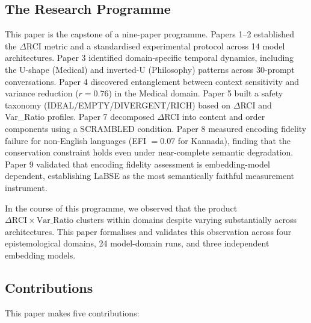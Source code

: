 \documentclass[11pt,a4paper]{article}
\begin{document}
\subsection{The Research Programme}

This paper is the capstone of a nine-paper programme. Papers 1--2
\citep{laxman2026a,laxman2026b} established the $\Delta$RCI metric and a standardised
experimental protocol across 14 model architectures. Paper 3 \citep{laxman2026c}
identified domain-specific temporal dynamics, including the U-shape (Medical) and
inverted-U (Philosophy) patterns across 30-prompt conversations. Paper 4
\citep{laxman2026d} discovered entanglement between context sensitivity and variance
reduction ($r = 0.76$) in the Medical domain. Paper 5 \citep{laxman2026e} built a
safety taxonomy (IDEAL/EMPTY/DIVERGENT/RICH) based on $\Delta$RCI and Var\_Ratio
profiles. Paper 7 \citep{laxman2026g} decomposed $\Delta$RCI into content and order
components using a SCRAMBLED condition. Paper 8 \citep{laxman2026h} measured encoding
fidelity failure for non-English languages (EFI $= 0.07$ for Kannada), finding that
the conservation constraint holds even under near-complete semantic degradation. Paper 9
\citep{laxman2026i} validated that encoding fidelity assessment is embedding-model
dependent, establishing LaBSE as the most semantically faithful measurement instrument.

In the course of this programme, we observed that the product $\Delta\text{RCI} \times
\text{Var\_Ratio}$ clusters within domains despite varying substantially across
architectures. This paper formalises and validates this observation across four
epistemological domains, 24 model-domain runs, and three independent embedding models.

\subsection{Contributions}

This paper makes five contributions:
\end{document}

